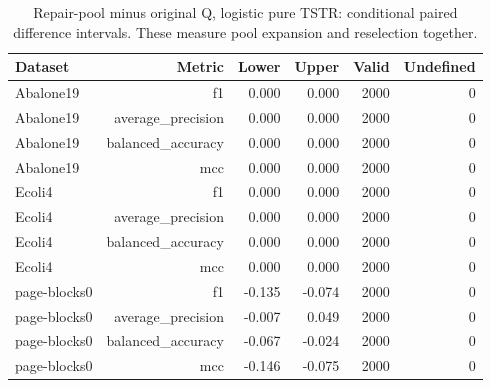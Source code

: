 \begin{table}[!t]
\centering
\caption{Repair-pool minus original Q, logistic pure TSTR: conditional paired difference intervals. These measure pool expansion and reselection together.}\label{tab:paired}
\footnotesize\setlength{\tabcolsep}{4pt}
\begin{tabular}{lrrrrr}
\toprule
Dataset & Metric & Lower & Upper & Valid & Undefined \\
\midrule
Abalone19 & f1 & 0.000 & 0.000 & 2000 & 0 \\
Abalone19 & average\_precision & 0.000 & 0.000 & 2000 & 0 \\
Abalone19 & balanced\_accuracy & 0.000 & 0.000 & 2000 & 0 \\
Abalone19 & mcc & 0.000 & 0.000 & 2000 & 0 \\
Ecoli4 & f1 & 0.000 & 0.000 & 2000 & 0 \\
Ecoli4 & average\_precision & 0.000 & 0.000 & 2000 & 0 \\
Ecoli4 & balanced\_accuracy & 0.000 & 0.000 & 2000 & 0 \\
Ecoli4 & mcc & 0.000 & 0.000 & 2000 & 0 \\
page-blocks0 & f1 & -0.135 & -0.074 & 2000 & 0 \\
page-blocks0 & average\_precision & -0.007 & 0.049 & 2000 & 0 \\
page-blocks0 & balanced\_accuracy & -0.067 & -0.024 & 2000 & 0 \\
page-blocks0 & mcc & -0.146 & -0.075 & 2000 & 0 \\
\bottomrule
\end{tabular}
\end{table}
